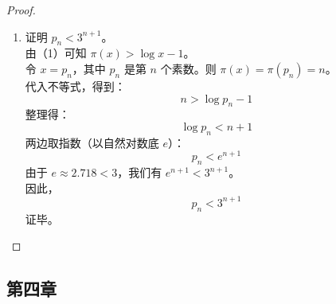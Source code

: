 \begin{enumerate}
\begin{proof}
\begin{enumerate}
            \item 证明 $p_n < 3^{n+1}$。\\
            由（1）可知 $\pi(x) > \log x - 1$。\\
            令 $x = p_n$，其中 $p_n$ 是第 $n$ 个素数。则 $\pi(x) = \pi(p_n) = n$。\\
            代入不等式，得到：
            \[ n > \log p_n - 1 \]
            整理得：
            \[ \log p_n < n + 1 \]
            两边取指数（以自然对数底 $e$）：
            \[ p_n < e^{n+1} \]
            由于 $e \approx 2.718 < 3$，我们有 $e^{n+1} < 3^{n+1}$。\\
            因此，
            \[ p_n < 3^{n+1} \]
            证毕。
        \end{enumerate}
    \end{proof}

\end{enumerate}

\subsection*{第四章}

